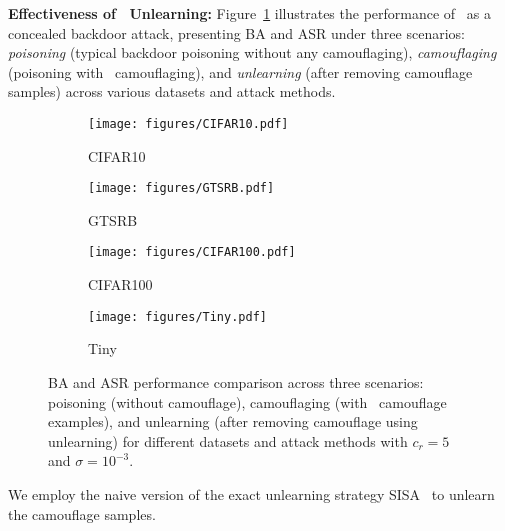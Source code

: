\vspace{0.15cm}
\noindent \textbf{Effectiveness of \methodname~Unlearning:} Figure~\ref{fig:unlearning} illustrates the performance of \methodname~as a concealed backdoor attack, presenting BA and ASR under three scenarios: \textit{poisoning} (typical backdoor poisoning without any camouflaging), \textit{camouflaging} (poisoning with \methodname~camouflaging), and \textit{unlearning} (after removing camouflage samples) across various datasets and attack methods.
\begin{figure}[!t]
    \centering
    \begin{subfigure}{0.48\linewidth}
        \centering
        \texttt{[image: figures/CIFAR10.pdf]}
        \caption{CIFAR10}
    \end{subfigure}\hspace{0.1cm}
    \begin{subfigure}{0.48\linewidth}
        \centering
        \texttt{[image: figures/GTSRB.pdf]}
        \caption{GTSRB}
    \end{subfigure}
    \begin{subfigure}{0.48\linewidth}
        \centering
        \texttt{[image: figures/CIFAR100.pdf]}
        \caption{CIFAR100}
    \end{subfigure}\hspace{0.1cm}
    \begin{subfigure}{0.48\linewidth}
        \centering
        \texttt{[image: figures/Tiny.pdf]}
        \caption{Tiny}
    \end{subfigure}
    \caption{BA and ASR performance comparison across three scenarios: poisoning (without camouflage), camouflaging (with \methodname~camouflage examples), and unlearning (after removing camouflage using unlearning) for different datasets and attack methods with $c_{r}=5$ and $\sigma=10^{-3}$.}
    \label{fig:unlearning}
\end{figure}
We employ the naive version of the exact unlearning strategy SISA~\cite{sisa} to unlearn the camouflage samples.
